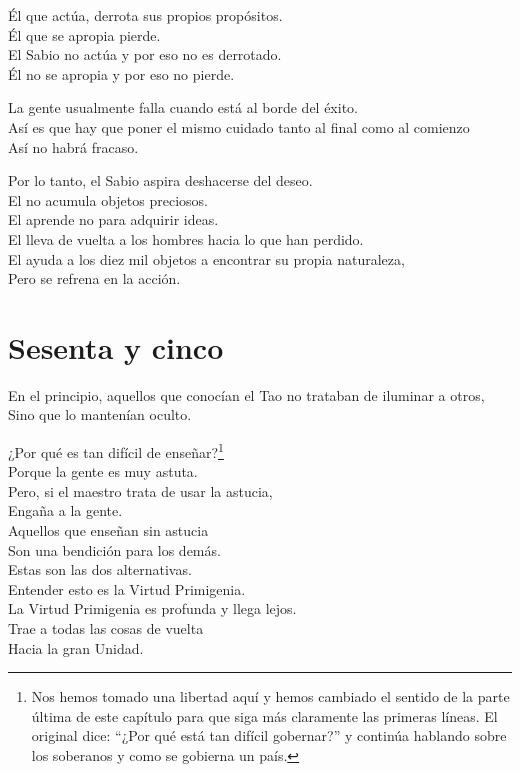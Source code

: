 \documentclass[hidelinks]{memoir}
\begin{document}
	Él que actúa, derrota sus propios propósitos.\\
	Él que se apropia pierde.\\
	El Sabio no actúa y por eso no es derrotado.\\
	Él no se apropia y por eso no pierde.
	
	La gente usualmente falla cuando está al borde del éxito.\\
	Así es que hay que poner el mismo cuidado tanto al final como al
	comienzo\\
	Así no habrá fracaso.
	
	Por lo tanto, el Sabio aspira deshacerse del deseo.\\
	El no acumula objetos preciosos.\\
	El aprende no para adquirir ideas.\\
	El lleva de vuelta a los hombres hacia lo que han perdido.\\
	El ayuda a los diez mil objetos a encontrar su propia naturaleza,\\
	Pero se refrena en la acción.
	
	\chapter*{Sesenta y cinco}
	
	En el principio, aquellos que conocían el Tao no trataban de iluminar a
	otros,\\
	Sino que lo mantenían oculto.
	
	¿Por qué es tan difícil de enseñar?\footnote{Nos hemos tomado una libertad aquí y hemos cambiado el sentido de la
		parte última de este capítulo para que siga más claramente las primeras
		líneas. El original dice: ``¿Por qué está tan difícil gobernar?'' y
		continúa hablando sobre los soberanos y como se gobierna un país.}\\
	Porque la gente es muy astuta.\\
	Pero, si el maestro trata de usar la astucia,\\
	Engaña a la gente.\\
	Aquellos que enseñan sin astucia\\
	Son una bendición para los demás.\\
	Estas son las dos alternativas.\\
	Entender esto es la Virtud Primigenia.\\
	La Virtud Primigenia es profunda y llega lejos.\\
	Trae a todas las cosas de vuelta\\
	Hacia la gran Unidad.
	
\end{document}
